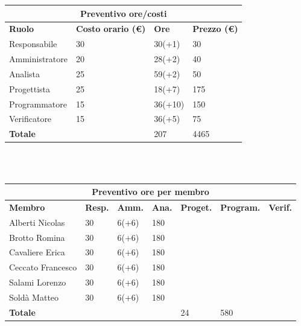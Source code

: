 \documentclass[a4paper, 12pt]{article}
\begin{document}
\begin{center}
	\begin{tabularx}{\textwidth}{|X|X|X|X|}
		\hline
		\multicolumn{4}{|c|}{\textbf{Preventivo ore/costi}}                                      \\
		\hline
		\hline
		\textbf{Ruolo}  & \textbf{Costo orario (\euro)} & \textbf{Ore} & \textbf{Prezzo (\euro)} \\
		\hline
		Responsabile    & 30                            & 30(+1)       & 30                     \\
		\hline
		Amministratore  & 20                            & 28(+2)       & 40                      \\
		\hline
		Analista        & 25                            & 59(+2)       & 50                       \\
		\hline
		Progettista     & 25                            & 18(+7)       & 175                      \\
		\hline
		Programmatore   & 15                            & 36(+10)       & 150                      \\
		\hline
		Verificatore    & 15                            & 36(+5)       & 75                      \\
		\hline
		\hline
		\textbf{Totale} &                               & 207          & 4465                   \\
		\hline
	\end{tabularx}\\[8pt]
	\mbox{}\\
\end{center}

\begin{center}
	\begin{tabularx}{\textwidth}{|X|X|X|X|X|X|X|}
		\hline
		\multicolumn{7}{|c|}{\textbf{Preventivo ore per membro}}                                      \\
		\hline
		\hline
		\textbf{Membro}  & \textbf{Resp.} & \textbf{Amm.} & \textbf{Ana.} &
		\textbf{Proget.} & \textbf{Program.} & \textbf{Verif.} \\
		\hline
		Alberti Nicolas    	& 30 	& 6(+6)       & 180  & &  &                 \\
		\hline
		Brotto Romina    	& 30 	& 6(+6)       & 180  & &  &                 \\
		\hline
		Cavaliere Erica    	& 30 	& 6(+6)       & 180  & &  &                 \\
		\hline
		Ceccato Francesco    	& 30 	& 6(+6)       & 180  & &   &                \\
		\hline
		Salami Lorenzo    	& 30 	& 6(+6)       & 180  & &     &               \\
		\hline
		Soldà Matteo    	& 30 	& 6(+6)       & 180  & &   &                 \\
		\hline
		\hline
		\textbf{Totale} &    & & & 24           & 580      &               \\
		\hline
	\end{tabularx}\\[8pt]
	\mbox{}\\
\end{center}
\end{document}
